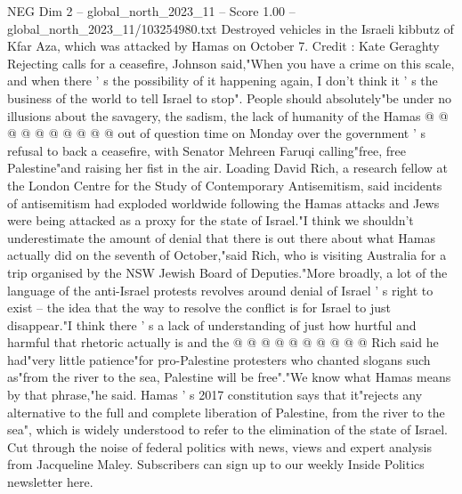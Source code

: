 \begin{textsample}{NEG Dim 2 – global\_north\_2023\_11 – Score 1.00 – global\_north\_2023\_11/103254980.txt}
Destroyed vehicles in the Israeli kibbutz of Kfar Aza, which was attacked by Hamas on October 7.
Credit : Kate Geraghty Rejecting calls for a ceasefire, Johnson said,"When you have a crime on this scale, and when there ' s the possibility of it happening again, I don't think it ' s the business of the world to tell Israel to stop".
People should absolutely"be under no illusions about the savagery, the sadism, the lack of humanity of the Hamas @ @ @ @ @ @ @ @ @ @ out of question time on Monday over the government ' s refusal to back a ceasefire, with Senator Mehreen Faruqi calling"free, free Palestine"and raising her fist in the air.
Loading David Rich, a research fellow at the London Centre for the Study of Contemporary Antisemitism, said incidents of antisemitism had exploded worldwide following the Hamas attacks and Jews were being attacked as a proxy for the state of Israel."I think we shouldn't underestimate the amount of denial that there is out there about what Hamas actually did on the seventh of October,"said Rich, who is visiting Australia for a trip organised by the NSW Jewish Board of Deputies."More broadly, a lot of the language of the anti-Israel protests revolves around denial of Israel ' s right to exist -- the idea that the way to resolve the conflict is for Israel to just disappear."I think there ' s a lack of understanding of just how hurtful and harmful that rhetoric actually is and the @ @ @ @ @ @ @ @ @ @ Rich said he had"very little patience"for pro-Palestine protesters who chanted slogans such as"from the river to the sea, Palestine will be free"."We know what Hamas means by that phrase,"he said.
Hamas ' s 2017 constitution says that it"rejects any alternative to the full and complete liberation of Palestine, from the river to the sea", which is widely understood to refer to the elimination of the state of Israel.
Cut through the noise of federal politics with news, views and expert analysis from Jacqueline Maley.
Subscribers can sign up to our weekly Inside Politics newsletter here.

\end{textsample}
